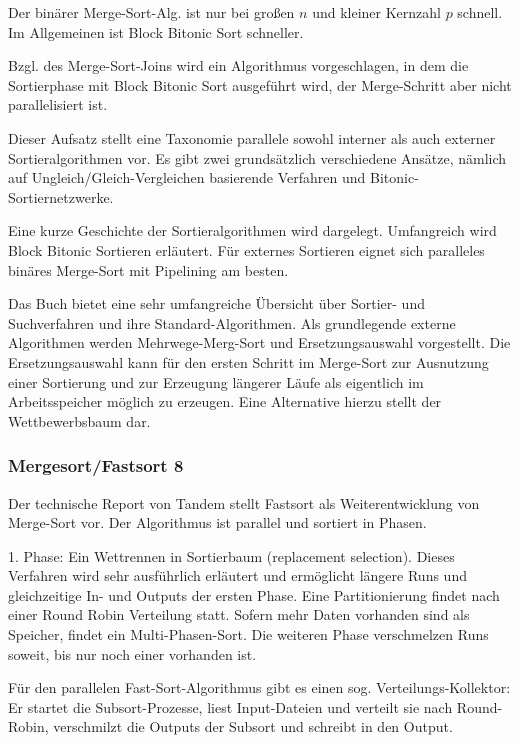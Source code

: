 \documentclass[a4paper,12pt,twoside]{article}
\begin{document}
Der binärer Merge-Sort-Alg. ist nur bei großen $n$ und kleiner Kernzahl $p$ schnell. Im Allgemeinen ist Block Bitonic Sort schneller.

Bzgl. des Merge-Sort-Joins wird ein Algorithmus vorgeschlagen, in dem die Sortierphase mit Block Bitonic Sort ausgeführt wird, der Merge-Schritt aber nicht parallelisiert ist. 

\textbf{}

Dieser Aufsatz stellt eine Taxonomie parallele sowohl interner als auch externer Sortieralgorithmen vor. Es gibt zwei grundsätzlich verschiedene Ansätze, nämlich auf Ungleich/Gleich-Vergleichen basierende Verfahren und Bitonic-Sortiernetzwerke.

Eine kurze Geschichte der Sortieralgorithmen wird dargelegt. Umfangreich wird Block Bitonic Sortieren erläutert. Für externes Sortieren eignet sich paralleles binäres Merge-Sort mit Pipelining am besten. 

\textbf{}

Das Buch bietet eine sehr umfangreiche Übersicht über Sortier- und Suchverfahren und ihre Standard-Algorithmen. Als grundlegende externe Algorithmen werden Mehrwege-Merg-Sort und Ersetzungsauswahl vorgestellt. Die Ersetzungsauswahl kann für den ersten Schritt im Merge-Sort zur Ausnutzung einer Sortierung und zur Erzeugung längerer Läufe als eigentlich im Arbeitsspeicher möglich zu erzeugen. Eine Alternative hierzu stellt der Wettbewerbsbaum dar. 

\subsubsection{Mergesort/Fastsort 8}

\textbf{}

Der technische Report von Tandem stellt Fastsort als Weiterentwicklung von Merge-Sort vor. Der Algorithmus ist parallel und sortiert in Phasen.

1. Phase: Ein Wettrennen in Sortierbaum (replacement selection). Dieses Verfahren wird sehr ausführlich erläutert und ermöglicht längere Runs und gleichzeitige In- und Outputs der ersten Phase. Eine Partitionierung findet nach einer Round Robin Verteilung statt.
Sofern mehr Daten vorhanden sind als Speicher, findet ein Multi-Phasen-Sort. Die weiteren Phase verschmelzen Runs soweit, bis nur noch einer vorhanden ist.

Für den parallelen Fast-Sort-Algorithmus gibt es einen sog. Verteilungs-Kollektor: Er startet die Subsort-Prozesse, liest Input-Dateien und verteilt sie nach Round-Robin, verschmilzt die Outputs der Subsort und schreibt in den Output.
\end{document}

